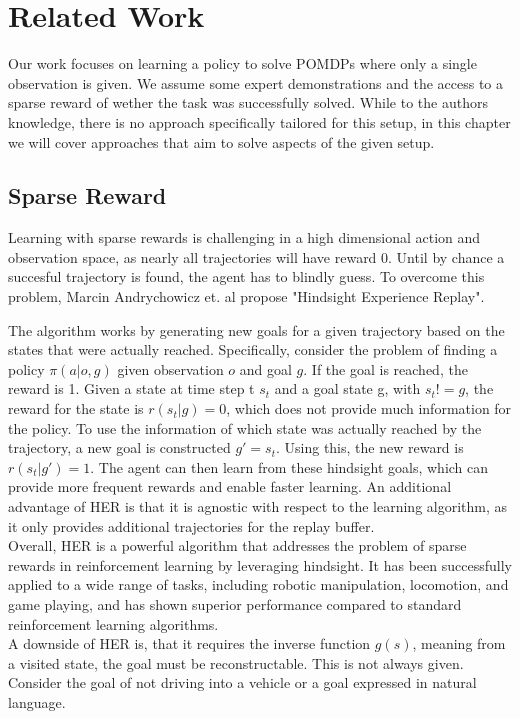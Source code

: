 
\chapter{Related Work}
\label{chapter:RelWork}
Our work focuses on learning a policy to solve POMDPs where only a single observation is given. We assume some expert demonstrations and the access to a sparse 
reward of wether the task was successfully solved. While to the authors knowledge, there is no approach specifically tailored for this setup, 
in this chapter we will cover approaches that aim to solve aspects of the given setup.

\section{Sparse Reward}
Learning with sparse rewards is challenging in a high dimensional action and observation space, as nearly all trajectories will have reward 0. 
Until by chance a succesful trajectory is found, the agent has to blindly guess. To overcome this problem, Marcin Andrychowicz et. al propose 
"Hindsight Experience Replay".

The algorithm works by generating new goals for a given trajectory based on the states that were actually reached. 
Specifically, consider the problem of finding a policy $\pi(a|o, g)$ given observation $o$ and goal $g$. 
If the goal is reached, the reward is 1. Given a state at time step t $s_t$ and a goal state g, with $s_t != g$, 
the reward for the state is $r(s_t|g) = 0$, which does not provide much information for the policy. 
To use the information of which state was actually
reached by the trajectory, a new goal is constructed $g' = s_t$. Using this, the new reward is $r(s_t|g') = 1$. 
The agent can then learn from these hindsight goals, which can provide more 
frequent rewards and enable faster learning. An additional advantage of HER is that it is agnostic with respect to the learning algorithm, as it only 
provides additional trajectories for the replay buffer.\\

Overall, HER is a powerful algorithm that addresses the problem of sparse rewards in reinforcement learning by leveraging hindsight. It has been successfully 
applied to a wide range of tasks, including robotic manipulation, locomotion, and game playing, and has shown superior performance compared to standard 
reinforcement learning algorithms.\\
A downside of HER is, that it requires the inverse function $g(s)$, meaning from a visited state, the goal must be reconstructable. This is not always given. 
Consider the goal of not driving into a vehicle or a goal expressed in natural language. 

